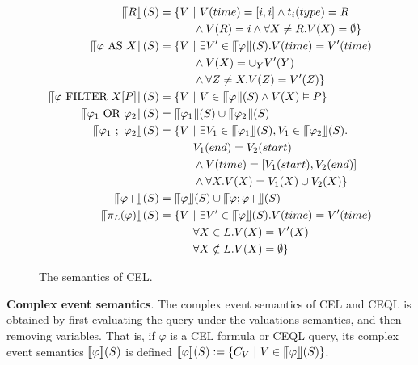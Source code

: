 \begin{figure}[t]
  \begin{align*}
    \InSBrackets{R}(S) &= \{V \ | \ V(time) = [i,i] \land t_{i}(type) = R\\
                       &\qquad\quad \land V(R) = {i} \land \forall X \ne R. V(X) = \emptyset \}\\
    \InSBrackets{\varphi \ \text{AS} \ X}(S) &= \{V \ | \ \exists V' \in \InSBrackets{\varphi}(S). V(time) = V'(time)\\
                       &\qquad\quad \land V(X) = \cup_{Y} V'(Y)\\
                       &\qquad\quad \land \forall Z \ne X. V(Z) = V'(Z)\}\\
    \InSBrackets{\varphi \ \text{FILTER} \ X[P]}(S) &= \{V \ | \ V \in \InSBrackets{\varphi}(S) \land V(X) \vDash P \}\\
    \InSBrackets{\varphi_{1} \ \text{OR} \ \varphi_{2}}(S) &= \InSBrackets{\varphi_{1}}(S) \cup \InSBrackets{\varphi_{2}}(S)\\
    \InSBrackets{\varphi_{1} \ ; \ \varphi_{2}}(S) &= \{V \ | \ \exists V_{1} \in \InSBrackets{\varphi_{1}}(S), V_{1} \in \InSBrackets{\varphi_{2}}(S).\\
                       &\qquad\quad  V_{1}(end) = V_{2}(start)\\
                       &\qquad\quad \land V(time) = [V_{1}(start), V_{2}(end)]\\
                       &\qquad\quad \land \forall X. V(X) = V_{1}(X) \cup V_{2}(X) \}\\
    \InSBrackets{\varphi+}(S) &= \InSBrackets{\varphi}(S) \cup \InSBrackets{\varphi;\varphi+}(S)\\
    \InSBrackets{\pi_{L}(\varphi)}(S) &= \{ V \ | \ \exists V' \in \InSBrackets{\varphi}(S). V(time) = V'(time)\\
                              &\qquad\quad \forall X \in L. V(X) = V'(X) \\
                              &\qquad\quad \forall X \notin L. V(X) = \emptyset \}
  \end{align*}
  \caption{The semantics of CEL.}
  \label{fig:cel:semantics}
\end{figure}

\textbf{Complex event semantics}. The complex event semantics of CEL and CEQL is obtained by first evaluating the query under the valuations semantics, and then removing variables. That is, if $\varphi$ is a CEL formula or CEQL query, its complex event semantics $\llbracket \varphi \rrbracket(S)$ is defined $\llbracket \varphi \rrbracket(S) := \{ C_{V} \ | \ V \in \llceil \varphi \rrfloor(S)\}$.

